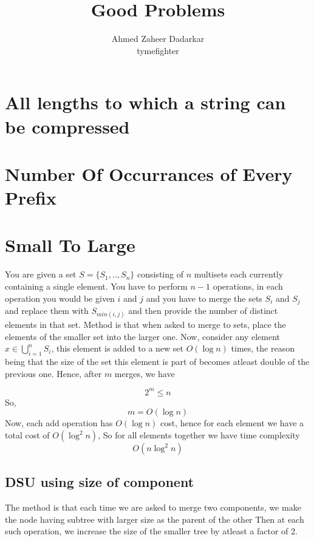 \documentclass{article}
\title{Good Problems}
\author{
    Ahmed Zaheer Dadarkar\\
    tymefighter
}
\begin{document}
    \maketitle

    \section{All lengths to which a string can be compressed}

    \section{Number Of Occurrances of Every Prefix}

    \section{Small To Large}

    You are given a set $S = \{S_1, .., S_n\}$ consisting of $n$ multisets
    each currently containing a single element. You have to perform $n - 1$
    operations, in each operation you would be given $i$ and $j$ and you 
    have to merge the sets $S_i$ and $S_j$ and replace them with $S_{min(i,j)}$
    and then provide the number of distinct elements in that set.
    Method is that when asked to merge to sets, place the elements of the smaller
    set into the larger one.
    Now, consider any element $x \in \bigcup_{i = 1}^{n}S_i$, this element is
    added to a new set $O(\log n)$ times, the reason being that the size of the
    set this element is part of becomes atleast double of the previous one.
    Hence, after $m$ merges, we have

    \[
        2^m \leq n
    \]
    So, 
    \[
        m = O(\log n)
    \]
    Now, each add operation has $O(\log n)$ cost, hence for each element we
    have a total cost of $O(\log^2n)$, So for all elements together we
    have time complexity
    \[
        O(n \log^2n)
    \]

    \subsection{DSU using size of component}

    The method is that each time we are asked to merge two components, we
    make the node having subtree with larger size as the parent of the other
    Then at each such operation, we increase the size of the smaller tree
    by atleast a factor of 2.
    
\end{document}
